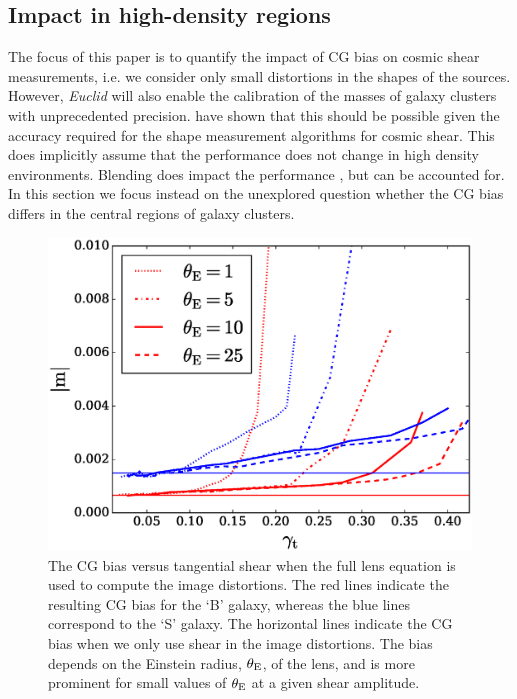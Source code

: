 \documentclass[useAMS,usenatbib]{mnras}
\begin{document}
\subsection{Impact in high-density regions}

The focus of this paper is to quantify the impact of CG bias on cosmic shear measurements,
i.e. we consider only small distortions in the shapes of the sources. However, {\it Euclid} will
also enable the calibration of the masses of galaxy clusters with unprecedented precision.
\cite{Koehlinger15} have shown that this should be possible given the accuracy required
for the shape measurement algorithms for cosmic shear. This does implicitly assume that the
performance does not change in high density environments. Blending does impact the performance
\citep{Hoekstra17}, but can be accounted for. In this section we focus instead on the unexplored question
whether the CG bias differs in the central regions of galaxy clusters.
%
\begin{figure}
  \centerline{\includegraphics[width=\hsize]{zcg_sis.eps}}
  \caption{The CG bias versus tangential shear when the full lens
    equation is used to compute the image distortions. The red lines
    indicate the resulting CG bias for the `B' galaxy, whereas the
    blue lines correspond to the `S' galaxy. The horizontal lines
    indicate the CG bias when we only use shear in the image
    distortions. The bias depends on the Einstein radius, $\theta_{\rm
      E}$, of the lens, and is more prominent for small values of
    $\theta_{\rm E}$ at a given shear amplitude.}
  \label{fig:biasofgamma}
\end{figure}
\end{document}
